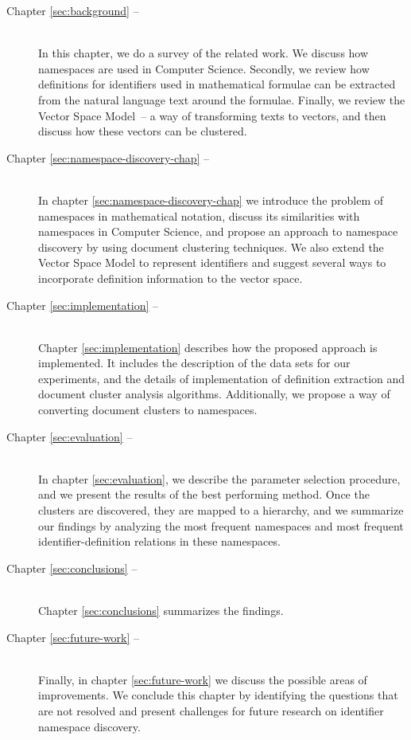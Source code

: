 \begin{description}
\item[Chapter \ref{sec:background} -- ] \hfill \\
  In this chapter, we do a survey of the related work. We discuss how namespaces are
  used in Computer Science. Secondly, we review how definitions for identifiers 
  used in mathematical formulae can be extracted from the natural language text
  around the formulae. Finally, we review the Vector Space Model~-- a way of 
  transforming texts to vectors, and then discuss how these vectors can be 
  clustered. 

\item[Chapter \ref{sec:namespace-discovery-chap} -- ] \hfill \\
  In chapter \ref{sec:namespace-discovery-chap} we introduce the problem of namespaces 
  in mathematical notation, discuss its similarities with namespaces in Computer Science,
  and propose an approach to namespace discovery by using document clustering techniques. 
  We also extend the Vector Space Model to represent identifiers and suggest several 
  ways to incorporate definition information to the vector space. 

\item[Chapter \ref{sec:implementation} -- ] \hfill \\
  Chapter \ref{sec:implementation} describes how the proposed approach is implemented. 
  It includes the description of the data sets for our experiments, and the details of 
  implementation of definition extraction and document cluster analysis algorithms. 
  Additionally, we propose a way of converting document clusters to namespaces.

\item[Chapter \ref{sec:evaluation} -- ] \hfill \\
  In chapter \ref{sec:evaluation}, we describe the parameter selection procedure,
  and we present the results of the best performing method. Once the clusters are 
  discovered, they are mapped to a hierarchy, and we summarize our findings 
  by analyzing the most frequent namespaces and most frequent identifier-definition
  relations in these namespaces.

\item[Chapter \ref{sec:conclusions} -- ] \hfill \\
  Chapter \ref{sec:conclusions} summarizes the findings.

\item[Chapter \ref{sec:future-work} -- ] \hfill \\
  Finally, in chapter \ref{sec:future-work} we discuss the possible areas of improvements.
  We conclude this chapter by identifying the questions that are not resolved and 
  present challenges for future research on identifier namespace discovery.

\end{description}